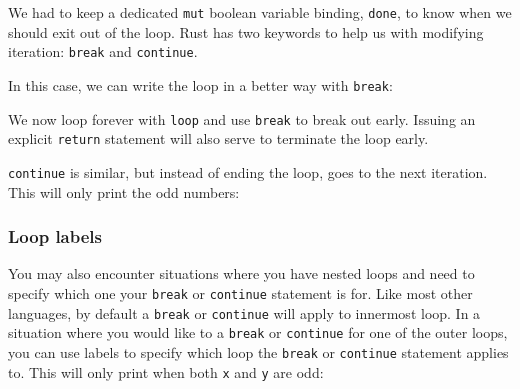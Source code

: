 \documentclass[a4paper,]{book}
\newenvironment{Shaded}{\begin{snugshade}}{\end{snugshade}}
\newcommand{\KeywordTok}[1]{\textcolor[rgb]{0.13,0.29,0.53}{\textbf{{#1}}}}
\newcommand{\DecValTok}[1]{\textcolor[rgb]{0.00,0.00,0.81}{{#1}}}
\newcommand{\StringTok}[1]{\textcolor[rgb]{0.31,0.60,0.02}{{#1}}}
\newcommand{\PreprocessorTok}[1]{\textcolor[rgb]{0.56,0.35,0.01}{\textit{{#1}}}}
\newcommand{\NormalTok}[1]{{#1}}
\begin{document}
We had to keep a dedicated \texttt{mut} boolean variable binding,
\texttt{done}, to know when we should exit out of the loop. Rust has two
keywords to help us with modifying iteration: \texttt{break} and
\texttt{continue}.

In this case, we can write the loop in a better way with \texttt{break}:

\begin{Shaded}
\end{Shaded}

We now loop forever with \texttt{loop} and use \texttt{break} to break
out early. Issuing an explicit \texttt{return} statement will also serve
to terminate the loop early.

\texttt{continue} is similar, but instead of ending the loop, goes to
the next iteration. This will only print the odd numbers:

\begin{Shaded}
\end{Shaded}

\subsubsection{Loop labels}\label{loop-labels}

You may also encounter situations where you have nested loops and need
to specify which one your \texttt{break} or \texttt{continue} statement
is for. Like most other languages, by default a \texttt{break} or
\texttt{continue} will apply to innermost loop. In a situation where you
would like to a \texttt{break} or \texttt{continue} for one of the outer
loops, you can use labels to specify which loop the \texttt{break} or
\texttt{continue} statement applies to. This will only print when both
\texttt{x} and \texttt{y} are odd:
\end{document}
